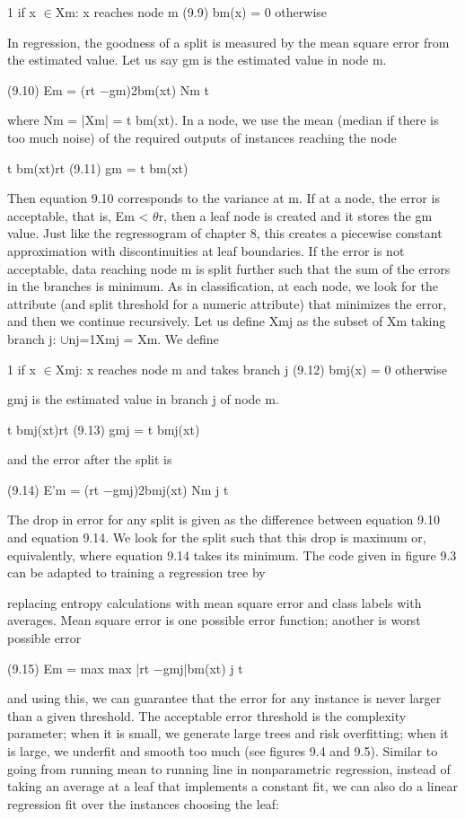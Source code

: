 1 if x $\in$Xm: x reaches node m (9.9) bm(x) = 0 otherwise

In regression, the goodness of a split is measured by the mean square error from the estimated value. Let us say gm is the estimated value in node m.

(9.10) Em = (rt $-$gm)2bm(xt) Nm t

where Nm = |Xm| = t bm(xt). In a node, we use the mean (median if there is too much noise) of the required outputs of instances reaching the node

t bm(xt)rt (9.11) gm = t bm(xt)

Then equation 9.10 corresponds to the variance at m. If at a node, the error is acceptable, that is, Em < $\theta$r, then a leaf node is created and it stores the gm value. Just like the regressogram of chapter 8, this creates a piecewise constant approximation with discontinuities at leaf boundaries. If the error is not acceptable, data reaching node m is split further such that the sum of the errors in the branches is minimum. As in classification, at each node, we look for the attribute (and split threshold for a numeric attribute) that minimizes the error, and then we continue recursively. Let us define Xmj as the subset of Xm taking branch j: $\cup$nj=1Xmj = Xm. We define

1 if x $\in$Xmj: x reaches node m and takes branch j (9.12) bmj(x) = 0 otherwise

gmj is the estimated value in branch j of node m.

t bmj(xt)rt (9.13) gmj = t bmj(xt)

and the error after the split is

(9.14) E'm = (rt $-$gmj)2bmj(xt) Nm j t

The drop in error for any split is given as the difference between equation 9.10 and equation 9.14. We look for the split such that this drop is maximum or, equivalently, where equation 9.14 takes its minimum. The code given in figure 9.3 can be adapted to training a regression tree by

replacing entropy calculations with mean square error and class labels with averages. Mean square error is one possible error function; another is worst possible error

(9.15) Em = max max |rt $-$gmj|bm(xt) j t

and using this, we can guarantee that the error for any instance is never larger than a given threshold. The acceptable error threshold is the complexity parameter; when it is small, we generate large trees and risk overfitting; when it is large, we underfit and smooth too much (see figures 9.4 and 9.5). Similar to going from running mean to running line in nonparametric regression, instead of taking an average at a leaf that implements a constant fit, we can also do a linear regression fit over the instances choosing the leaf:

